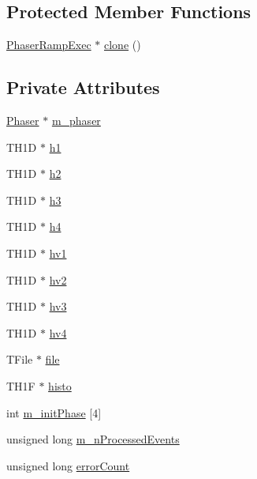 \subsection*{Protected Member Functions}
\begin{DoxyCompactItemize}
\item 
\hyperlink{classPhaserRampExec}{Phaser\+Ramp\+Exec} $\ast$ \hyperlink{classPhaserRampExec_a2586b2209d381c5b82a13dc2f997925f}{clone} ()
\end{DoxyCompactItemize}
\subsection*{Private Attributes}
\begin{DoxyCompactItemize}
\item 
\hyperlink{classPhaser}{Phaser} $\ast$ \hyperlink{classPhaserRampExec_a3c187e98596d492f195c2743322e263b}{m\+\_\+phaser}
\item 
T\+H1D $\ast$ \hyperlink{classPhaserRampExec_a8c13c96564df17be4e71685684e67edd}{h1}
\item 
T\+H1D $\ast$ \hyperlink{classPhaserRampExec_a538d1b02ed14d13c71f54b2b48e765ba}{h2}
\item 
T\+H1D $\ast$ \hyperlink{classPhaserRampExec_ad9ec4185f676732648c4886f28c9c6b7}{h3}
\item 
T\+H1D $\ast$ \hyperlink{classPhaserRampExec_aa487df389ad66093dba562f27f558128}{h4}
\item 
T\+H1D $\ast$ \hyperlink{classPhaserRampExec_ad2a2a82a0be74bc39c84b580e33d9c34}{hv1}
\item 
T\+H1D $\ast$ \hyperlink{classPhaserRampExec_a9762fd546432b5f3dffc4c5323af56ac}{hv2}
\item 
T\+H1D $\ast$ \hyperlink{classPhaserRampExec_ad3127f38a360044f7ad8fed272f916f9}{hv3}
\item 
T\+H1D $\ast$ \hyperlink{classPhaserRampExec_a998b7e5a8d186df60c2d60cba2b43aa0}{hv4}
\item 
T\+File $\ast$ \hyperlink{classPhaserRampExec_a63092bcbec01af94b4c5c842b81d2ccf}{file}
\item 
T\+H1F $\ast$ \hyperlink{classPhaserRampExec_a0c8d1c3ee09159cba1b1a07ce3fb1d96}{histo}
\item 
int \hyperlink{classPhaserRampExec_a7526a42abb33e880d60570386fd23e3e}{m\+\_\+init\+Phase} \mbox{[}4\mbox{]}
\item 
unsigned long \hyperlink{classPhaserRampExec_a198ba1ebb9a1b0fb2c599405307e92af}{m\+\_\+n\+Processed\+Events}
\item 
unsigned long \hyperlink{classPhaserRampExec_a3f09b8bf4cd8f5425adf8ae168d39e50}{error\+Count}
\end{DoxyCompactItemize}
